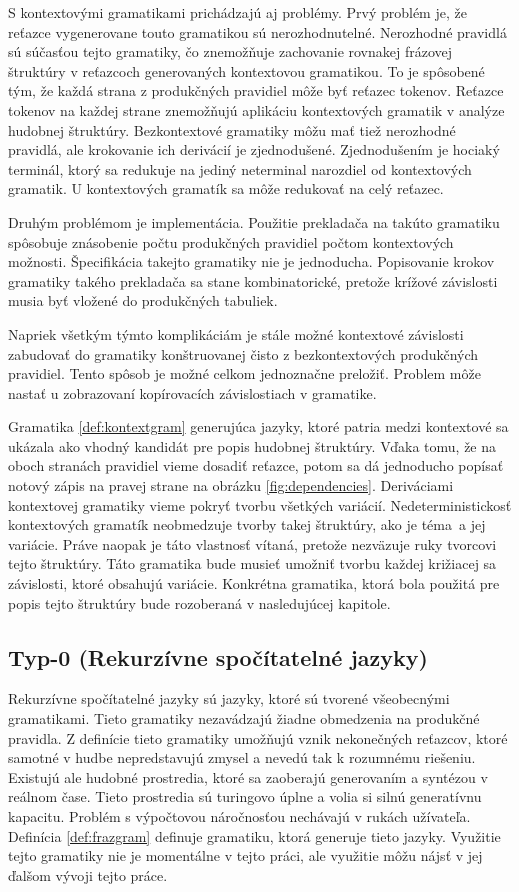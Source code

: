 S kontextovými gramatikami prichádzajú aj problémy. Prvý problém je, že reťazce vygenerovane touto gramatikou sú nerozhodnutelné. Nerozhodné pravidlá sú súčasťou tejto gramatiky, čo znemožňuje zachovanie rovnakej frázovej štruktúry v reťazcoch generovaných kontextovou gramatikou. To je spôsobené tým, že každá strana z produkčných pravidiel môže byť reťazec tokenov. Reťazce tokenov na každej strane znemožňujú aplikáciu kontextových gramatik v analýze hudobnej štruktúry. Bezkontextové gramatiky môžu mať tiež nerozhodné pravidlá, ale krokovanie ich derivácií je zjednodušené. Zjednodušením je hociaký terminál, ktorý sa redukuje na jediný neterminal narozdiel od kontextových gramatik. U kontextových gramatík sa môže redukovať na celý reťazec.

Druhým problémom je implementácia. Použitie prekladača na takúto gramatiku spôsobuje znásobenie počtu produkčných pravidiel počtom kontextových možnosti. Špecifikácia takejto gramatiky nie je jednoducha. Popisovanie krokov gramatiky takého prekladača sa stane kombinatorické, pretože krížové závislosti musia byť vložené do produkčných tabuliek.

Napriek všetkým týmto komplikáciám je stále možné kontextové závislosti zabudovať do gramatiky konštruovanej čisto z bezkontextových produkčných pravidiel. Tento spôsob je možné celkom jednoznačne preložiť. Problem môže nastať u zobrazovaní kopírovacích závislostiach v gramatike.

Gramatika \ref{def:kontextgram} generujúca jazyky, ktoré patria medzi kontextové sa ukázala ako vhodný kandidát pre popis hudobnej štruktúry. Vďaka tomu, že na oboch stranách pravidiel vieme dosadiť reťazce, potom sa dá jednoducho popísať notový zápis na pravej strane na obrázku \ref{fig:dependencies}. Deriváciami kontextovej gramatiky vieme pokryť tvorbu všetkých variácií. Nedeterministickosť kontextových gramatík neobmedzuje tvorby takej štruktúry, ako je téma~a jej variácie. Práve naopak je táto vlastnosť vítaná, pretože nezväzuje ruky tvorcovi tejto štruktúry. Táto gramatika bude musieť umožniť tvorbu každej križiacej sa závislosti, ktoré obsahujú variácie. Konkrétna gramatika, ktorá bola použitá pre popis tejto štruktúry bude rozoberaná v nasledujúcej kapitole.

\subsection*{Typ-0 (Rekurzívne spočítatelné jazyky)}
Rekurzívne spočítatelné jazyky sú jazyky, ktoré sú tvorené všeobecnými gramatikami. Tieto gramatiky nezavádzajú žiadne obmedzenia na produkčné pravidla. Z definície tieto gramatiky umožňujú vznik nekonečných reťazcov, ktoré samotné v hudbe nepredstavujú zmysel a nevedú tak k rozumnému riešeniu. Existujú ale hudobné prostredia, ktoré sa zaoberajú generovaním a syntézou v reálnom čase. Tieto prostredia sú turingovo úplne a volia si silnú generatívnu kapacitu. Problém s výpočtovou náročnosťou nechávajú v rukách užívateľa. Definícia \ref{def:frazgram} definuje gramatiku, ktorá generuje tieto jazyky. Využitie tejto gramatiky nie je momentálne v tejto práci, ale využitie môžu nájsť v jej ďalšom vývoji tejto práce.

